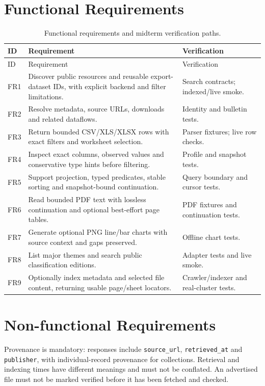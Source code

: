 \documentclass[a4paper,12pt]{report}
\newcommand{\code}[1]{\texttt{\small #1}}
\begin{document}
\section{Functional Requirements}
\setlength{\LTcapwidth}{\textwidth}
\begin{longtable}{L{13mm} L{88mm} L{40mm}}
\caption{Functional requirements and midterm verification paths.}\label{tab:req}\\
\toprule ID & Requirement & Verification \\
\midrule\endfirsthead
\toprule ID & Requirement & Verification \\
\midrule\endhead
FR1 & Discover public resources and reusable export-dataset IDs, with explicit backend and filter limitations. & Search contracts; indexed/live smoke. \\
FR2 & Resolve metadata, source URLs, downloads and related dataflows. & Identity and bulletin tests. \\
FR3 & Return bounded CSV/XLS/XLSX rows with exact filters and worksheet selection. & Parser fixtures; live row checks. \\
FR4 & Inspect exact columns, observed values and conservative type hints before filtering. & Profile and snapshot tests. \\
FR5 & Support projection, typed predicates, stable sorting and snapshot-bound continuation. & Query boundary and cursor tests. \\
FR6 & Read bounded PDF text with lossless continuation and optional best-effort page tables. & PDF fixtures and continuation tests. \\
FR7 & Generate optional PNG line/bar charts with source context and gaps preserved. & Offline chart tests. \\
FR8 & List major themes and search public classification editions. & Adapter tests and live smoke. \\
FR9 & Optionally index metadata and selected file content, returning usable page/sheet locators. & Crawler/indexer and real-cluster tests. \\
\bottomrule
\end{longtable}

\section{Non-functional Requirements}
Provenance is mandatory: responses include \code{source\_url}, \code{retrieved\_at} and \code{publisher}, with individual-record provenance for collections. Retrieval and indexing times have different meanings and must not be conflated. An advertised file must not be marked verified before it has been fetched and checked.
\end{document}
